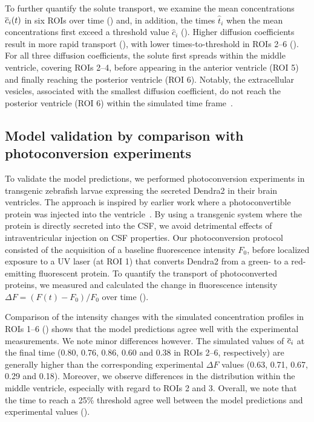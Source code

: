 \documentclass{WileyMSP-template}
\begin{document}
To further quantify the solute transport, we examine the mean
concentrations $\overline{c}_i(t)$ in six ROIs over time
() and, in addition, the times $\hat{t}_i$
when the mean concentrations first exceed a threshold value
$\hat{c}_i$ ().  Higher diffusion coefficients
result in more rapid transport (), with
lower times-to-threshold in ROIs 2--6 (). For
all three diffusion coefficients, the solute first spreads within the
middle ventricle, covering ROIs 2--4, before appearing in the anterior
ventricle (ROI 5) and finally reaching the posterior ventricle
(ROI 6). Notably, the extracellular vesicles, associated with the smallest diffusion
coefficient, do not reach the posterior ventricle (ROI 6) within the
simulated time frame~.

\subsection{Model validation by comparison with photoconversion experiments}

To validate the model predictions, we performed photoconversion
experiments in transgenic zebrafish larvae expressing the secreted
Dendra2 in their brain ventricles. The approach is inspired by earlier work
where a photoconvertible protein was injected into the ventricle~\cite{fame2016directional}.
By using a transgenic system where the protein is directly secreted into the CSF,
we avoid detrimental effects of intraventricular injection on CSF properties. 
Our photoconversion protocol
consisted of the acquisition of a baseline fluorescence intensity
$F_0$, before localized exposure to a UV laser (at ROI 1) that
converts Dendra2 from a green- to a red-emitting fluorescent
protein. To quantify the transport of photoconverted proteins, we
measured and calculated the change in fluorescence intensity $\Delta F
= (F(t)-F_0)/F_0$ over time ().

Comparison of the intensity changes with the simulated concentration
profiles in ROIs 1--6 () shows that the
model predictions agree well with the experimental measurements. We
note minor differences however. The simulated values of $\overline{c}_i$ at
the final time (0.80, 0.76, 0.86, 0.60 and 0.38 in ROIs 2--6, respectively)
are generally higher than the corresponding experimental $\Delta F$
values (0.63, 0.71, 0.67, 0.29 and 0.18). Moreover, we observe
differences in the distribution within the middle ventricle,
especially with regard to ROIs 2 and 3. Overall, we note that the time
to reach a 25\% threshold agree well between the model predictions and
experimental values ().
\end{document}
